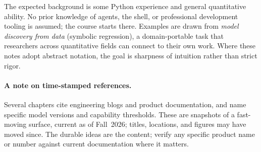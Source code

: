 The expected background is some Python experience and general quantitative ability.
No prior knowledge of agents, the shell, or professional development tooling is assumed; the course starts there.
Examples are drawn from \emph{model discovery from data} (symbolic regression), a domain-portable task that researchers across quantitative fields can connect to their own work.
Where these notes adopt abstract notation, the goal is sharpness of intuition rather than strict rigor.

\paragraph{A note on time-stamped references.}
Several chapters cite engineering blogs and product documentation, and name specific model versions and capability thresholds.
These are snapshots of a fast-moving surface, current as of Fall~2026; titles, locations, and figures may have moved since.
The durable ideas are the content; verify any specific product name or number against current documentation where it matters.
